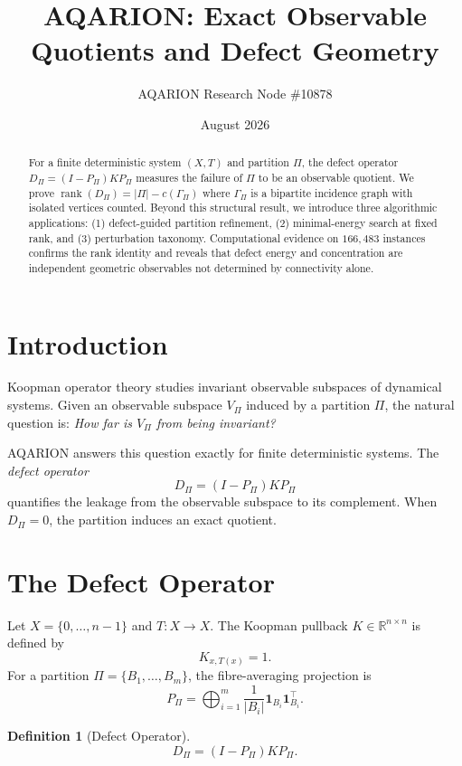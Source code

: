 \documentclass[11pt]{article}
\title{AQARION: Exact Observable Quotients and Defect Geometry}
\author{AQARION Research Node \#10878}
\date{August 2026}
\theoremstyle{definition}
\newtheorem{definition}{Definition}
\begin{document}
\maketitle

\begin{abstract}
For a finite deterministic system $(X,T)$ and partition $\Pi$, the defect operator
$D_\Pi = (I-P_\Pi)KP_\Pi$ measures the failure of $\Pi$ to be an observable quotient.
We prove $\operatorname{rank}(D_\Pi) = |\Pi| - c(\Gamma_\Pi)$ where $\Gamma_\Pi$ is a bipartite incidence graph with isolated vertices counted.
Beyond this structural result, we introduce three algorithmic applications:
(1) defect-guided partition refinement, (2) minimal-energy search at fixed rank,
and (3) perturbation taxonomy. Computational evidence on $166{,}483$ instances
confirms the rank identity and reveals that defect energy and concentration
are independent geometric observables not determined by connectivity alone.
\end{abstract}

\section{Introduction}

Koopman operator theory studies invariant observable subspaces of dynamical systems.
Given an observable subspace $V_\Pi$ induced by a partition $\Pi$, the natural question is:
\textit{How far is $V_\Pi$ from being invariant?}

AQARION answers this question exactly for finite deterministic systems.
The \emph{defect operator}
\[
D_\Pi = (I-P_\Pi)KP_\Pi
\]
quantifies the leakage from the observable subspace to its complement.
When $D_\Pi = 0$, the partition induces an exact quotient.

\section{The Defect Operator}

Let $X = \{0,\dots,n-1\}$ and $T: X \to X$.
The Koopman pullback $K \in \mathbb{R}^{n \times n}$ is defined by
\[
K_{x,T(x)} = 1.
\]
For a partition $\Pi = \{B_1,\dots,B_m\}$, the fibre-averaging projection is
\[
P_\Pi = \bigoplus_{i=1}^m \frac{1}{|B_i|} \mathbf{1}_{B_i} \mathbf{1}_{B_i}^\top .
\]

\begin{definition}[Defect Operator]
\[
D_\Pi = (I-P_\Pi) K P_\Pi.
\]
\end{definition}
\end{document}
